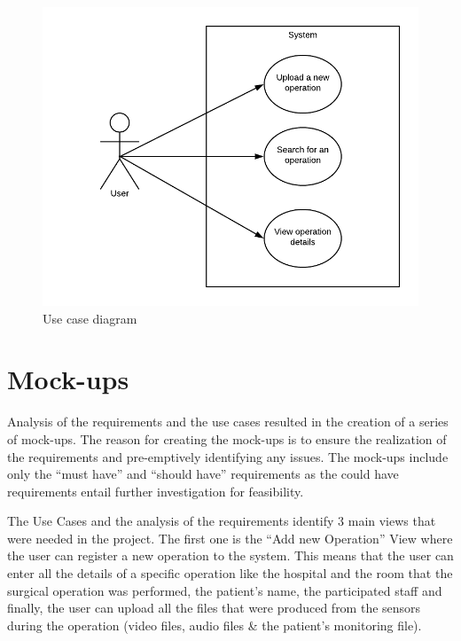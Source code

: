 \begin{figure}[h]
\begin{center}
\includegraphics[width=17cm]{imgs/Use_Case_Diagram.png}
\end{center}\vspace{-0.3cm}
\caption[Use Case Diagram]{Use case diagram} \label{UC-diagram}
\end{figure}

\section{Mock-ups}
\label{sub:Mock_Ups}

Analysis of the requirements and the use cases resulted in the creation of a series of mock-ups. The reason for creating the mock-ups is to ensure the realization of the requirements and pre-emptively identifying any issues. The mock-ups include only the ``must have'' and ``should have'' requirements as the could have requirements entail further investigation for feasibility.

The Use Cases and the analysis of the requirements identify 3 main views that were needed in the project. 
The first one is the ``Add new Operation'' View where the user can register a new operation to the system. This means that the user can enter all the details of a specific operation like the hospital and the room that the surgical operation was performed, the patient's name, the participated staff and finally, the user can upload all the files that were produced from the sensors during the operation (video files, audio files \& the patient's monitoring file).


